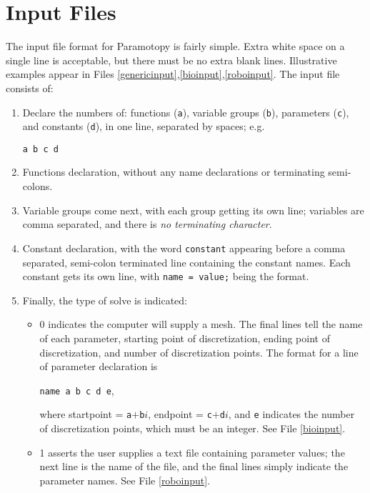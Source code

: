 \clearpage
\section{Input Files}
\label{sec:input}

The input file format for Paramotopy is fairly simple.  Extra white space on a single line is acceptable, but there must be no extra blank lines.  Illustrative examples appear in Files \ref{genericinput},\ref{bioinput},\ref{roboinput}. The input file consists of:

\begin{enumerate} 
\item Declare the numbers of: functions (\texttt{a}), variable groups (\texttt{b}), parameters (\texttt{c}), and constants (\texttt{d}), in one line, separated by spaces; e.g. \begin{center} \texttt{a b c d} \end{center}
\item Functions declaration, without any name declarations or terminating semi-colons.  
\item Variable groups come next, with each group getting its own line; variables are comma separated, and there is \emph{no terminating character}.  
\item Constant declaration,  with the word \texttt{constant} appearing before a comma separated, semi-colon terminated line containing the constant names.  Each constant gets its own line, with \texttt{name = value;} being the format.  
\item Finally, the type of solve is indicated: 
\begin{itemize} 

	\item 0 indicates the computer will supply a mesh.  The final lines tell the name of each parameter, starting point of discretization, ending point of discretization, and number of discretization points.  The format for a line of parameter declaration is \begin{center} \texttt{name  a  b  c  d  e}, \end{center} where startpoint = \texttt{a}$+$\texttt{b}$i$, endpoint = \texttt{c}$+$\texttt{d}$i$, and \texttt{e} indicates the number of discretization points, which must be an integer. See File \ref{bioinput}.

	
	\item 1 asserts the user supplies a text file containing parameter values; the next line is the name of the file, and the final lines simply indicate the parameter names.  See File \ref{roboinput}.
		\end{itemize}
\end{enumerate}

